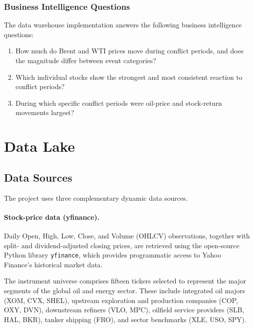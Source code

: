\documentclass[11pt,a4paper]{article}
\begin{document}
\subsubsection{Business Intelligence Questions}
\label{sec:bi_questions}

The data warehouse implementation answers the following business
intelligence questions:

\begin{enumerate}[label=\textbf{BI\arabic*.}, leftmargin=*]
  \item How much do Brent and WTI prices move during conflict periods,
        and does the magnitude differ between event categories?
  \item Which individual stocks show the strongest and most consistent
        reaction to conflict periods?
  \item During which specific conflict periods were oil-price and
        stock-return movements largest?
\end{enumerate}

\newpage

\section{Data Lake}
\label{sec:data_lake}

\subsection{Data Sources}
\label{sec:data_sources}

The project uses three complementary dynamic data sources.

\paragraph{Stock-price data (yfinance).}
Daily Open, High, Low, Close, and Volume (OHLCV) observations, together
with split- and dividend-adjusted closing prices, are retrieved using the
open-source Python library \texttt{yfinance}, which provides programmatic
access to Yahoo Finance's historical market data.

The instrument universe comprises fifteen tickers selected to represent
the major segments of the global oil and energy sector. These include
integrated oil majors (XOM, CVX, SHEL), upstream exploration and
production companies (COP, OXY, DVN), downstream refiners (VLO, MPC),
oilfield service providers (SLB, HAL, BKR), tanker shipping (FRO), and
sector benchmarks (XLE, USO, SPY).
\end{document}
